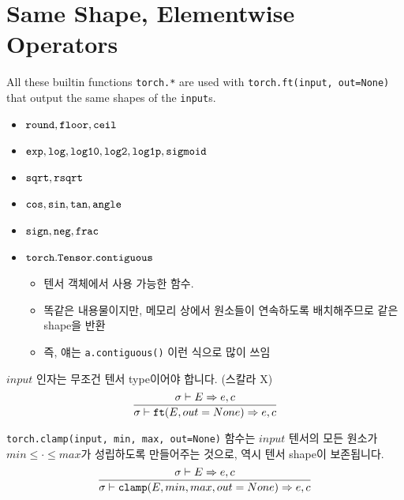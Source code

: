 \documentclass{article}
\begin{document}
\section*{Same Shape, Elementwise Operators}
All these builtin functions \texttt{torch.*} are used with
\texttt{torch.ft(input, out=None)} that output the same shapes of the
\texttt{input}s.
\begin{itemize}
  \item $\mathtt{round}, \mathtt{floor}, \mathtt{ceil}$
  \item $\mathtt{exp}, \mathtt{log}, \mathtt{log10}, \mathtt{log2}, \mathtt{log1p},
  \mathtt{sigmoid}$
  \item $\mathtt{sqrt}, \mathtt{rsqrt}$
  \item $\mathtt{cos}, \mathtt{sin}, \mathtt{tan}, \mathtt{angle}$
  \item $\mathtt{sign}, \mathtt{neg}, \mathtt{frac}$
  \item $\mathtt{torch.Tensor.contiguous}$
  \begin{itemize}
    \item 텐서 객체에서 사용 가능한 함수.
    \item 똑같은 내용물이지만, 메모리 상에서 원소들이 연속하도록 배치해주므로 같은 shape을 반환
    \item 즉, 얘는 \texttt{a.contiguous()} 이런 식으로 많이 쓰임
  \end{itemize}
\end{itemize}
$input$ 인자는 무조건 텐서 type이어야 합니다. (스칼라 X)
\begin{align*}
  \frac
  {
    \sigma \vdash E \Rightarrow e, c
  }
  {
    \sigma \vdash \mathtt{ft(}E, out=None\mathtt{)} \Rightarrow e, c
  }
\end{align*}

\texttt{torch.clamp(input, min, max, out=None)} 함수는 $input$ 텐서의 모든
원소가 $min \leq \cdot \leq max$가 성립하도록 만들어주는 것으로, 역시 텐서
shape이 보존됩니다.
\begin{align*}
  \frac
  {
    \sigma \vdash E \Rightarrow e, c
  }
  {
    \sigma \vdash \mathtt{clamp(}E, min, max, out=None\mathtt{)} \Rightarrow e, c
  }
\end{align*}
\end{document}
